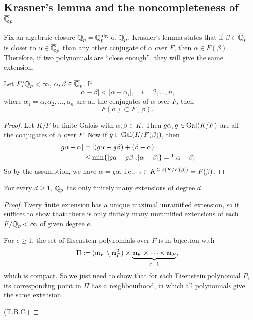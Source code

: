 \subsection{\texorpdfstring{Krasner's lemma and the noncompleteness of $\overline{\mathbb{Q}}_p$}{Krasner's lemma and the noncompleteness of bar Qp}}
Fix an algebraic closure $\overline{\mathbb{Q}}_p = \mathbb{Q}_p^{\mathrm{alg}}$ of $\mathbb{Q}_p$.
Krasner's lemma states that if $\beta\in\overline{\mathbb{Q}}_p$ is closer to $\alpha\in\overline{\mathbb{Q}}_p$ than any other conjugate of $\alpha$ over $F$,
then $\alpha\in F(\beta)$. Therefore, if two polynomials are ``close enough'', they will give the same extension.
\begin{theorem}
    \label{Krasner lemma}
    Let $F/\mathbb{Q}_p < \infty$, $\alpha, \beta\in \overline{\mathbb{Q}}_p$. If \[|\alpha - \beta| < |\alpha-\alpha_i|,\quad i = 2, \dots, n,\]
    where $\alpha_1 = \alpha, \alpha_2, \dots, \alpha_n$ are all the conjugates of $\alpha$ over $F$,
    then \[F(\alpha)\subset F(\beta).\]
\end{theorem}
\begin{proof}
    Let $K/F$ be finite Galois with $\alpha, \beta\in K$. Then $g\alpha, g\in\operatorname{Gal}(K/F)$ are all the conjugates of $\alpha$ over $F$.
    Now if $g\in \operatorname{Gal}(K/F(\beta))$, then \begin{align*}
        |g\alpha - \alpha|
        &= |(g\alpha - g\beta) + (\beta - \alpha)|\\ &
        \le\min\{|g\alpha - g\beta| , |\alpha - \beta|\} =\footnotemark |\alpha - \beta|
    \end{align*}
    So by the assumption,
    we have $\alpha = g\alpha$,
    i.e., $\alpha\in K^{\operatorname{Gal}(K/F(\beta))} = F(\beta)$.
\end{proof}

\begin{theorem}
    For every $d\ge 1$, $\mathbb{Q}_p$ has only finitely many extensions of degree $d$.
\end{theorem}
\begin{proof}
    Every finite extension has a unique maximal unramified extension, so it suffices to show that: there is only finitely many unramified extensions of each $F/\mathbb{Q}_p < \infty$ of given degree $e$.

    For $e\ge 1$, the set of Eisenstein polynomials over $F$ is in bijection with \[\Pi := (\mathfrak{m}_F\setminus\mathfrak{m}_F^2)\times \underbrace{\mathfrak{m}_F\times\dots\times\mathfrak{m}_F}_{e-1},\]
    which is compact.
    So we just need to show that for each Eisenstein polynomial $P$, its corresponding point in $\Pi$ has a neighbourhood, in which all polynomials give the same extension.

    (T.B.C.)
\end{proof}

